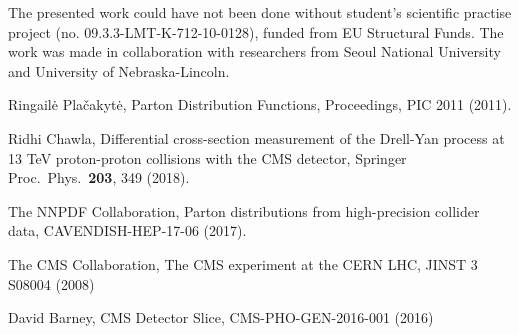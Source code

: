 \documentclass[a0,portrait]{a0poster}
\begin{document}
\begin{multicols}{2}
\begin{centering}
\begin{minipage}[t]{0.48\linewidth}
		\vspace{-0.7cm}
	\end{minipage}
\end{centering}
\vspace{0.5cm}

\noindent The presented work could have not been done without student's scientific practise project (no. 09.3.3-LMT-K-712-10-0128),
funded from EU Structural Funds.
The work was made in collaboration with researchers from Seoul National University and University of Nebraska-Lincoln.

\begin{thebibliography}{References}
	\vspace{-0.5cm}
	 Ringail\.{e} Pla\v{c}akyt\.{e}, Parton Distribution Functions, Proceedings, PIC 2011 (2011).
	
	 Ridhi Chawla, Differential cross-section measurement of the Drell-Yan process at 13 TeV proton-proton
	collisions with the CMS detector, Springer Proc.\ Phys.\  \textbf{203}, 349 (2018).	
	
	 The NNPDF Collaboration, Parton distributions from high-precision collider data, CAVENDISH-HEP-17-06 (2017).


	 The CMS Collaboration, The CMS experiment at the CERN LHC, JINST 3 S08004 (2008)

	 David Barney, CMS Detector Slice, CMS-PHO-GEN-2016-001 (2016)

\end{thebibliography}

\end{multicols}
\end{document}
